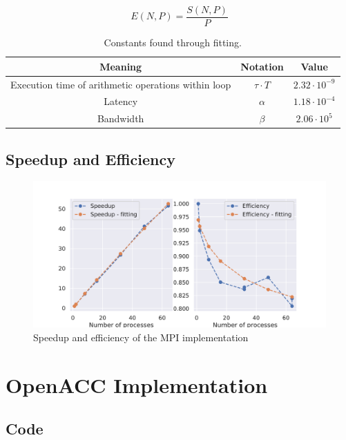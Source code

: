 \documentclass[a4paper,12pt]{article}
\begin{document}
\[
    E(N, P) = \frac{S(N, P)}{P}
\] 

\begin{table}[H]
    \centering
    \caption{Constants found through fitting.}
    \begin{tabular}{| c | c | c |}
        \hline
        Meaning & Notation & Value\\
        \hline
        Execution time of arithmetic operations within loop &
        \(\tau \cdot T\) &
        \( 2.32 \cdot 10^{-9}\) \\ %
        Latency & \(\alpha\) &
        \(1.18 \cdot 10^{-4}\) \\ %
        Bandwidth & \(\beta\) &
        \(2.06 \cdot 10^{5}\) \\ %


        \hline
    \end{tabular}
\end{table}

\subsection{Speedup and Efficiency}

\begin{figure}[H]
    \centering
    \includegraphics[width=\textwidth]{../img/speedup-mpi.pdf}
    \caption{Speedup and efficiency of the MPI implementation}
\end{figure}

\section{OpenACC Implementation}

\subsection{Code}
\end{document}
